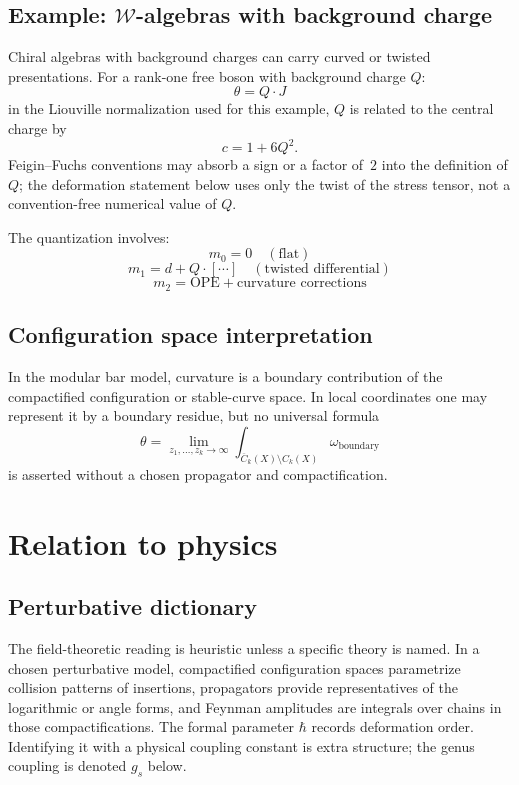 \subsection{Example: $\mathcal{W}$-algebras with background charge}

Chiral algebras with background charges can carry curved or twisted
presentations. For a rank-one free boson with background charge $Q$:
\[\theta = Q \cdot J\]
in the Liouville normalization used for this example,
\(Q\) is related to the central charge by
\[
c = 1 + 6Q^2.
\]
Feigin--Fuchs conventions may absorb a sign or a factor of~$2$ into
the definition of \(Q\); the deformation statement below uses only
the twist of the stress tensor, not a convention-free numerical value
of \(Q\).

The quantization involves:
\[m_0 = 0 \quad (\text{flat})\]
\[m_1 = d + Q \cdot [\cdots] \quad (\text{twisted differential})\]
\[m_2 = \text{OPE} + \text{curvature corrections}\]

\subsection{Configuration space interpretation}

In the modular bar model, curvature is a boundary contribution of the
compactified configuration or stable-curve space. In local coordinates
one may represent it by a boundary residue, but no universal formula
\[
\theta=\lim_{z_1,\ldots,z_k\to\infty}
\int_{\overline{C}_k(X)\setminus C_k(X)}\omega_{\mathrm{boundary}}
\]
is asserted without a chosen propagator and compactification.

\section{Relation to physics}

\subsection{Perturbative dictionary}

The field-theoretic reading is heuristic unless a specific theory is
named. In a chosen perturbative model, compactified configuration spaces
parametrize collision patterns of insertions, propagators provide
representatives of the logarithmic or angle forms, and Feynman
amplitudes are integrals over chains in those compactifications. The
formal parameter \(\hbar\) records deformation order. Identifying it
with a physical coupling constant is extra structure; the genus
coupling is denoted \(g_s\) below.

